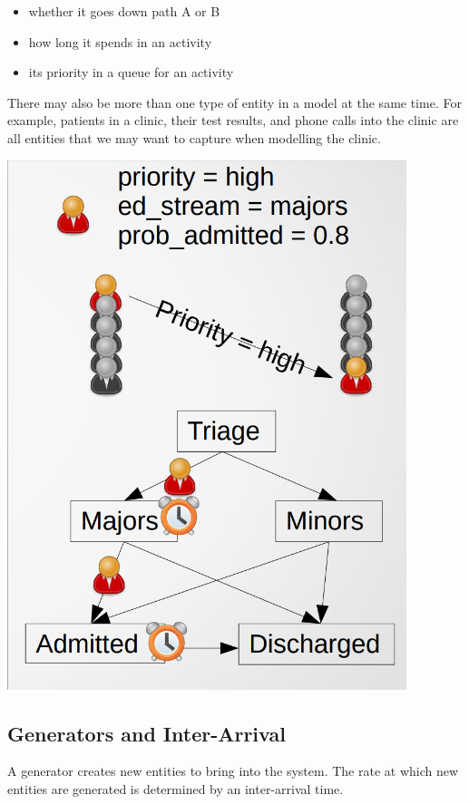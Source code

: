 \documentclass[
  letterpaper,
  DIV=11,
  numbers=noendperiod]{scrreprt}
\providecommand{\tightlist}{%
  \setlength{\itemsep}{0pt}\setlength{\parskip}{0pt}}\usepackage{longtable,booktabs,array}
\begin{document}
\begin{itemize}
\tightlist
\item
  whether it goes down path A or B
\item
  how long it spends in an activity
\item
  its priority in a queue for an activity
\end{itemize}

There may also be more than one type of entity in a model at the same
time. For example, patients in a clinic, their test results, and phone
calls into the clinic are all entities that we may want to capture when
modelling the clinic.

\includegraphics{images/des_entities.png}

\subsection{Generators and
Inter-Arrival}\label{generators-and-inter-arrival}

A generator creates new entities to bring into the system. The rate at
which new entities are generated is determined by an inter-arrival time.
\end{document}
